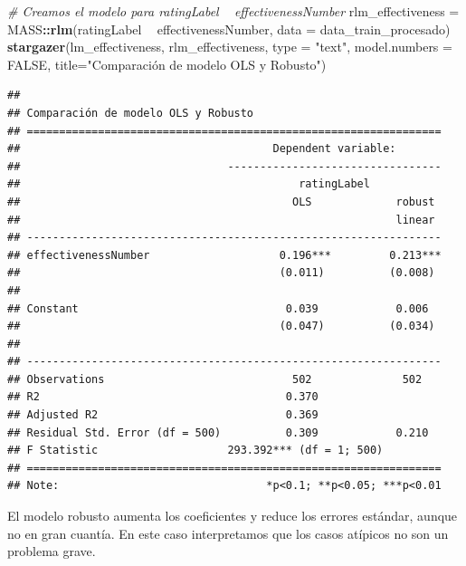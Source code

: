 \documentclass[spanish,]{article}
\newenvironment{Shaded}{\begin{snugshade}}{\end{snugshade}}
\newcommand{\KeywordTok}[1]{\textcolor[rgb]{0.13,0.29,0.53}{\textbf{#1}}}
\newcommand{\DataTypeTok}[1]{\textcolor[rgb]{0.13,0.29,0.53}{#1}}
\newcommand{\StringTok}[1]{\textcolor[rgb]{0.31,0.60,0.02}{#1}}
\newcommand{\CommentTok}[1]{\textcolor[rgb]{0.56,0.35,0.01}{\textit{#1}}}
\newcommand{\OtherTok}[1]{\textcolor[rgb]{0.56,0.35,0.01}{#1}}
\newcommand{\OperatorTok}[1]{\textcolor[rgb]{0.81,0.36,0.00}{\textbf{#1}}}
\newcommand{\NormalTok}[1]{#1}
\begin{document}
\begin{Shaded}
\begin{Highlighting}[]
\CommentTok{# Creamos el modelo para ratingLabel ~ effectivenessNumber}
\NormalTok{rlm_effectiveness =}\StringTok{ }\NormalTok{MASS}\OperatorTok{::}\KeywordTok{rlm}\NormalTok{(ratingLabel }\OperatorTok{~}\StringTok{ }\NormalTok{effectivenessNumber, }
                              \DataTypeTok{data =}\NormalTok{ data_train_procesado)}
\KeywordTok{stargazer}\NormalTok{(lm_effectiveness, rlm_effectiveness, }\DataTypeTok{type =} \StringTok{"text"}\NormalTok{, }\DataTypeTok{model.numbers =} \OtherTok{FALSE}\NormalTok{, }
          \DataTypeTok{title=}\StringTok{"Comparación de modelo OLS y Robusto"}\NormalTok{)}
\end{Highlighting}
\end{Shaded}

\begin{verbatim}
## 
## Comparación de modelo OLS y Robusto
## ================================================================
##                                       Dependent variable:       
##                                ---------------------------------
##                                           ratingLabel           
##                                          OLS             robust 
##                                                          linear 
## ----------------------------------------------------------------
## effectivenessNumber                    0.196***         0.213***
##                                        (0.011)          (0.008) 
##                                                                 
## Constant                                0.039            0.006  
##                                        (0.047)          (0.034) 
##                                                                 
## ----------------------------------------------------------------
## Observations                             502              502   
## R2                                      0.370                   
## Adjusted R2                             0.369                   
## Residual Std. Error (df = 500)          0.309            0.210  
## F Statistic                    293.392*** (df = 1; 500)         
## ================================================================
## Note:                                *p<0.1; **p<0.05; ***p<0.01
\end{verbatim}

El modelo robusto aumenta los coeficientes y reduce los errores
estándar, aunque no en gran cuantía. En este caso interpretamos que los
casos atípicos no son un problema grave.
\end{document}
